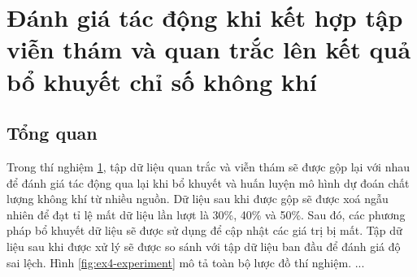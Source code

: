 \section{Đánh giá tác động khi kết hợp tập viễn thám và quan trắc lên kết quả bổ khuyết chỉ số không khí}
\label{ex-4}
\subsection{Tổng quan}
Trong thí nghiệm \ref{ex-4}, tập dữ liệu quan trắc và viễn thám sẽ được gộp lại với nhau để đánh giá tác động qua lại khi bổ khuyết và huấn luyện mô hình dự đoán chất lượng không khí từ nhiều nguồn. Dữ liệu sau khi được gộp sẽ được xoá ngẫu nhiên để đạt tỉ lệ mất dữ liệu lần lượt là 30\%, 40\% và 50\%. Sau đó, các phương pháp bổ khuyết dữ liệu sẽ được sử dụng để cập nhật các giá trị bị mất. Tập dữ liệu sau khi được xử lý sẽ được so sánh với tập dữ liệu ban đầu để đánh giá độ sai lệch. Hình \ref{fig:ex4-experiment} mô tả toàn bộ lược đồ thí nghiệm.
...

